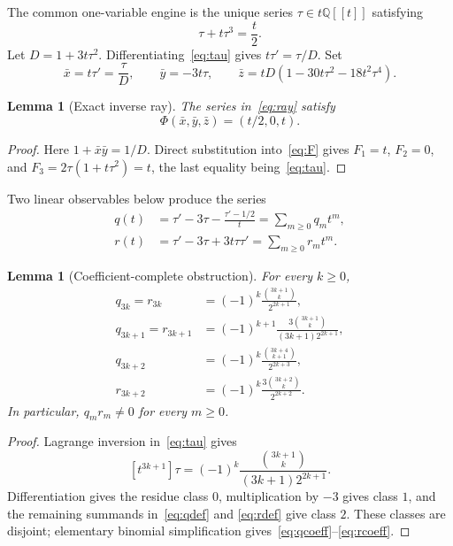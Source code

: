 \documentclass[11pt]{article}
\newtheorem{lemma}[theorem]{Lemma}
\newcommand{\Q}{\mathbb Q}
\begin{document}
The common one-variable engine is the unique series $\tau\in t\Q[[t]]$
satisfying
\begin{equation}
 \tau+t\tau^3=\frac t2.
 \label{eq:tau}
\end{equation}
Let $D=1+3t\tau^2$.  Differentiating~\eqref{eq:tau} gives
$t\tau'=\tau/D$.  Set
\begin{equation}
 \bar x=t\tau'=\frac{\tau}{D},\qquad
 \bar y=-3t\tau,\qquad
 \bar z=tD(1-30t\tau^2-18t^2\tau^4).
 \label{eq:ray}
\end{equation}

\begin{lemma}[Exact inverse ray]\label{lem:ray}
The series in~\eqref{eq:ray} satisfy
\[
 \Phi(\bar x,\bar y,\bar z)=(t/2,0,t).
\]
\end{lemma}

\begin{proof}
Here $1+\bar x\bar y=1/D$.  Direct substitution into~\eqref{eq:F}
gives $F_1=t$, $F_2=0$, and
$F_3=2\tau(1+t\tau^2)=t$, the last equality being~\eqref{eq:tau}.
\end{proof}

Two linear observables below produce the series
\begin{align}
 q(t)&=\tau'-3\tau-\frac{\tau'-1/2}{t}
      =\sum_{m\ge0}q_mt^m,\label{eq:qdef}\\
 r(t)&=\tau'-3\tau+3t\tau\tau'
      =\sum_{m\ge0}r_mt^m.\label{eq:rdef}
\end{align}

\begin{lemma}[Coefficient-complete obstruction]\label{lem:coefficients}
For every $k\ge0$,
\begin{align}
q_{3k}=r_{3k}
 &=(-1)^k\frac{\binom{3k+1}{k}}{2^{2k+1}},\nonumber\\
q_{3k+1}=r_{3k+1}
 &=(-1)^{k+1}
 \frac{3\binom{3k+1}{k}}{(3k+1)2^{2k+1}},\nonumber\\
q_{3k+2}
 &=(-1)^k\frac{\binom{3k+4}{k+1}}{2^{2k+3}},\label{eq:qcoeff}\\
r_{3k+2}
 &=(-1)^k\frac{3\binom{3k+2}{k}}{2^{2k+2}}.\label{eq:rcoeff}
\end{align}
In particular, $q_mr_m\ne0$ for every $m\ge0$.
\end{lemma}

\begin{proof}
Lagrange inversion in~\eqref{eq:tau} gives
\[
 [t^{3k+1}]\tau=
 (-1)^k\frac{\binom{3k+1}{k}}{(3k+1)2^{2k+1}}.
\]
Differentiation gives the residue class $0$, multiplication by $-3$ gives
class $1$, and the remaining summands in~\eqref{eq:qdef} and
\eqref{eq:rdef} give class $2$.  These classes are disjoint; elementary
binomial simplification gives~\eqref{eq:qcoeff}--\eqref{eq:rcoeff}.
\end{proof}
\end{document}
